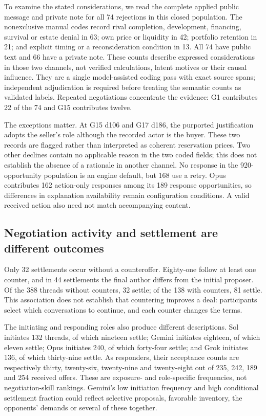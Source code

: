 To examine the stated considerations, we read the complete applied public
message and private note for all 74 rejections in this closed population.
The nonexclusive manual codes record rival completion, development, financing,
survival or estate denial in 63; own price or liquidity in 42; portfolio
retention in 21; and explicit timing or a reconsideration condition in 13.
All 74 have public text and 66 have a private note. These counts describe
expressed considerations in those two channels, not verified calculations,
latent motives or their causal influence. They are a single model-assisted
coding pass with exact source spans; independent adjudication is required
before treating the semantic counts as validated labels. Repeated negotiations
concentrate the evidence: G1 contributes 22 of the 74 and G15 contributes twelve.

The exceptions matter. At G15 d106 and G17 d186, the purported justification
adopts the seller's role although the recorded actor is the buyer. These two
records are flagged rather than interpreted as coherent reservation prices.
Two other declines contain no applicable reason in the two coded fields;
this does not establish the absence of a rationale in another channel.
No response in the 920-opportunity population is an engine default, but 168
use a retry. Opus contributes 162 action-only responses among its 189 response
opportunities, so differences in explanation availability remain configuration
conditions. A valid received action also need not match accompanying content.

\subsection{Negotiation activity and settlement are different outcomes}
\label{sec:agenda-negotiation-outcomes}

Only 32 settlements occur without a counteroffer. Eighty-one follow at least
one counter, and in 44 settlements the final author differs from the initial
proposer. Of the 388 threads without counters, 32 settle; of the 138 with
counters, 81 settle. This association does not establish that countering
improves a deal: participants select which conversations to continue, and each
counter changes the terms.

The initiating and responding roles also produce different descriptions.
Sol initiates 132 threads, of which nineteen settle; Gemini initiates eighteen,
of which eleven settle; Opus initiates 240, of which forty-four settle; and
Grok initiates 136, of which thirty-nine settle. As responders, their acceptance
counts are respectively thirty, twenty-six, twenty-nine and twenty-eight out
of 235, 242, 189 and 254 received offers. These are exposure- and role-specific
frequencies, not negotiation-skill rankings. Gemini's low initiation frequency
and high conditional settlement fraction could reflect selective proposals,
favorable inventory, the opponents' demands or several of these together.

